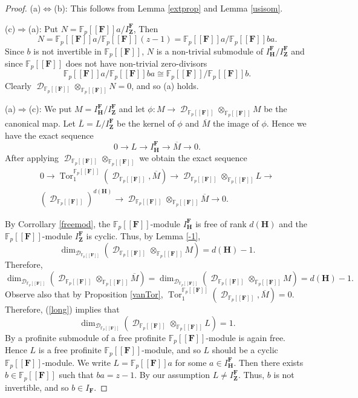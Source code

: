 \documentclass[11pt]{amsart}
\numberwithin{claimcounter}{lem}
\DeclareMathOperator{\D}{\mathcal D}
\DeclareMathOperator{\Tor}{Tor}
\newcommand{\F}{\mathbb{F}}
\begin{document}
\begin{proof} (a)$\Longleftrightarrow$(b):  This follows from
 Lemma \ref{extprop} and  Lemma \ref{usisom}.
 
    
 (c)$\Longrightarrow$(a):  Put $
 N=\F_p[[\mathbf F]]a/I_\mathbf Z^{\mathbf F}$, Then $$N=\F_p[[\mathbf F]]a/\F_p[[\mathbf F]](z-1)=\F_p[[\mathbf F]]a/\F_p[[\mathbf F]]ba.$$  Since $b$ is not invertible in $\F_p[[\mathbf F]]$,   
 $N$ is a non-trivial submodule of $I_\mathbf H^{\mathbf F}/I_\mathbf Z^{\mathbf F}$ and since  $\F_p[[\mathbf F]]$ does not have non-trivial zero-divisors $$\F_p[[\mathbf F]]a/\F_p[[\mathbf F]]ba \cong \F_p[[\mathbf F]]/\F_p[[\mathbf F]]b.$$ Clearly
 $ \D_{\F_p[[\mathbf F]]}\otimes_{\F_p[[\mathbf F]]} N=0$, and so (a) holds.
 
 (a)$\Longrightarrow$(c):  We put $M=I_\mathbf H^{\mathbf F}/I^{\mathbf F}_\mathbf Z$ and let  $\phi: M\to \D_{\F_p[[\mathbf F]]}\otimes_{\F_p[[\mathbf F]]} M$ be the canonical map.
  Let $\overline L=L/I_\mathbf Z^{\mathbf F}$ be the kernel of $\phi$ and $\overline M$ the image of $\phi$. Hence  we have  the exact sequence
  $$0\to L\to  I_\mathbf H^{\mathbf F}\to \overline M\to 0.$$
  After applying  $\D_{\F_p[[\mathbf F]]}\otimes_{\F_p[[\mathbf F]]}$ we obtain the exact sequence 
 \begin{multline}\label{long}
 0\to   \Tor_1^{\F_p[[\mathbf F]]}(\D_{\F_p[[\mathbf F]]}, \overline M) 
\to \D_{\F_p[[\mathbf F]]} \otimes_{\F_p[[\mathbf F]]} L\to \\
    (\D_{\F_p[[\mathbf F]]})^{d(\mathbf H)}\to \D_{\F_p[[\mathbf F]]}\otimes_{\F_p[[\mathbf F]]}  \overline M\to 0.\end{multline}

  By Corrollary \ref{freemod}, the $\F_p[[\mathbf F]]$-module $I_\mathbf H^{\mathbf F}$ is free of rank $d(\mathbf H)$ and the $\F_p[[\mathbf F]]$-module $I_\mathbf Z^{\mathbf F}$ is cyclic. Thus,  by Lemma \ref{-1},
  $$ \dim_{\D_{\F_p[[\mathbf F]]}}( \D_{\F_p[[\mathbf F]]}\otimes_{\F_p[[\mathbf F]]} M)=d(\mathbf H)-1.$$
  Therefore, $$\dim_{\D_{\F_p[[\mathbf F]]}} (\D_{\F_p[[\mathbf F]]}\otimes_{\F_p[[\mathbf F]]} \overline M)=\dim_{\D_{\F_p[[\mathbf F]]}}(\D_{\F_p[[\mathbf F]]}\otimes_{\F_p[[\mathbf F]]} M)=d(\mathbf H)-1.$$
  Observe also that by Proposition \ref{vanTor}, $\Tor_1^{\F_p[[\mathbf F]]}(\D_{\F_p[[\mathbf F]]}, \overline M) =0$. Therefore,  (\ref{long}) implies that 
  $$\dim_{\D_{\F_p[[\mathbf F]]}}(\D_{\F_p[[\mathbf F]]} \otimes_{\F_p[[\mathbf F]]} L)=1.$$
By \cite[Lemma 3.1]{Ja17}  a profinite submodule of a free profinite $\F_p[[\mathbf F]]$-module is again free.   Hence $L$ is a free profinite $\F_p[[\mathbf F]]$-module, and so $L$ should be a cyclic     
  $\F_p[[\mathbf F]]$-module.  We write $L=\F_p[[\mathbf F]]a$ for some  $a\in  I_\mathbf H^{\mathbf F}$. Then there exists  $b\in \F_p[[\mathbf F]]$ such that $ba=z-1$. By our assumption $L\ne I_\mathbf Z^{\mathbf F}$. Thus, $b$ is not invertible, and so  $b\in I_{\mathbf F}$.
 

\end{proof}
\end{document}
